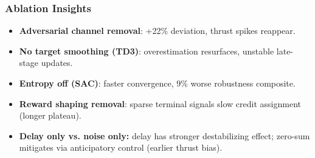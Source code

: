 
\begin{frame}
  \frametitle{Ablation Insights}
  \small
  \begin{itemize}\setlength{\itemsep}{4pt}
    \item \textbf{Adversarial channel removal}: +22\% deviation, thrust spikes reappear.
    \item \textbf{No target smoothing (TD3)}: overestimation resurfaces, unstable late-stage updates.
    \item \textbf{Entropy off (SAC)}: faster convergence, 9\% worse robustness composite.
    \item \textbf{Reward shaping removal}: sparse terminal signals slow credit assignment (longer plateau).
    \item \textbf{Delay only vs. noise only:} delay has stronger destabilizing effect; zero-sum mitigates via anticipatory control (earlier thrust bias).
  \end{itemize}
\end{frame}

